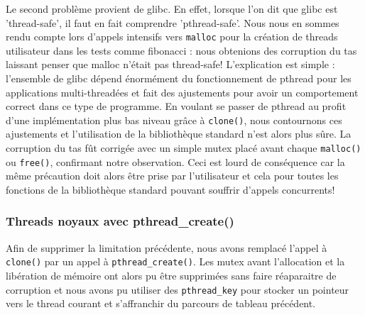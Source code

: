 Le second problème provient de glibc. En effet, lorsque l'on dit que glibc est
'thread-safe', il faut en fait comprendre 'pthread-safe'. Nous nous en sommes
rendu compte lors d'appels intensifs vers \verb!malloc! pour la création de
threads utilisateur dans les tests comme fibonacci : nous obtenions des
corruption du tas laissant penser que malloc n'était pas thread-safe!
L'explication est simple : l'ensemble de glibc dépend énormément du
fonctionnement de pthread pour les applications multi-threadées et fait des
ajustements pour avoir un comportement correct dans ce type de programme. En
voulant se passer de pthread au profit d'une implémentation plus bas niveau
grâce à \verb!clone()!, nous contournons ces ajustements et l'utilisation de
la bibliothèque standard n'est alors plus sûre. La corruption du tas fût
corrigée avec un simple mutex placé avant chaque \verb!malloc()! ou
\verb!free()!, confirmant notre observation. Ceci est lourd de conséquence car
la même précaution doit alors être prise par l'utilisateur et cela pour toutes les fonctions de la bibliothèque standard pouvant souffrir d'appels concurrents!


\subsubsection{Threads noyaux avec pthread\_create()}

Afin de supprimer la limitation précédente, nous avons remplacé l'appel à \verb!clone()! par un appel à \verb!pthread_create()!. Les mutex avant l'allocation et la libération de mémoire ont alors pu être supprimées sans faire réaparaitre de corruption et nous avons pu utiliser des \verb!pthread_key! pour stocker un pointeur vers le thread courant et s'affranchir du parcours de tableau précédent.

